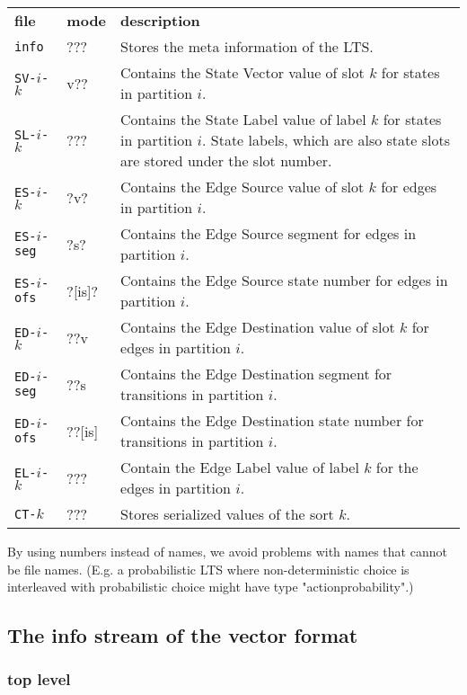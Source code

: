 \par\noindent\begin{tabularx}{\textwidth}{llX}
{\bf file} & {\bf mode} & {\bf description}
\\
\verb+info+ & ??? & Stores the meta information of the LTS.
\\
\verb+SV-+$i$\verb+-+$k$ & v?? & Contains the State Vector value of slot $k$ for states in partition $i$.
\\
\verb+SL-+$i$\verb+-+$k$ & ??? & Contains the State Label value of label $k$ for states in partition $i$.
State labels, which are also state slots are stored under the slot number.
\\
\verb+ES-+$i$\verb+-+$k$ & ?v? & Contains the Edge Source value of slot $k$ for edges in partition $i$.
\\
\verb+ES-+$i$\verb+-seg+ & ?s? &Contains the Edge Source segment for edges in partition $i$.
\\
\verb+ES-+$i$\verb+-ofs+ & ?[is]? & Contains the Edge Source state number for edges in partition $i$.
\\
\verb+ED-+$i$\verb+-+$k$ & ??v & Contains the Edge Destination value of slot $k$ for edges in partition $i$.
\\
\verb+ED-+$i$\verb+-seg+ & ??s & Contains the Edge Destination segment for transitions in partition $i$.
\\
\verb+ED-+$i$\verb+-ofs+ & ??[is] & Contains the Edge Destination state number for transitions in partition $i$.
\\
\verb+EL-+$i$\verb+-+$k$ & ??? & Contain the Edge Label value of label $k$ for the edges in partition $i$.
\\
\verb+CT-+$k$ & ??? & Stores serialized values of the sort $k$.
\end{tabularx}

By using numbers instead of names, we avoid problems with names that cannot be file names.
(E.g. a probabilistic LTS where non-deterministic choice is interleaved
 with probabilistic choice might have type "action\/probability".)

\subsection{The info stream of the vector format}

\subsubsection{top level}

